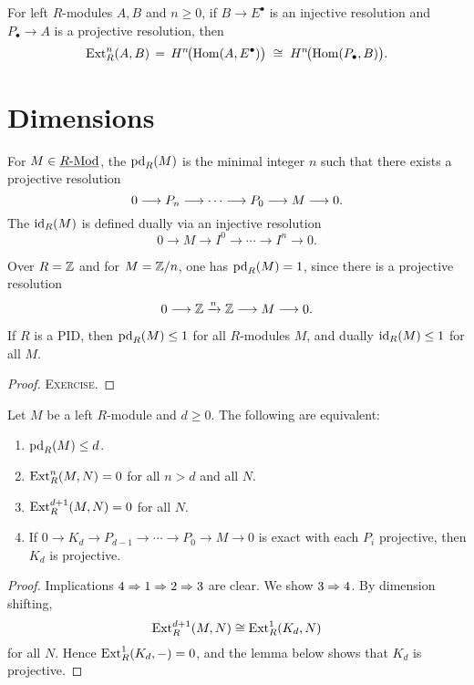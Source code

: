 \begin{theorem*}
	For left \( R \)-modules \( A,B \) and \( n\ge 0 \), if \( B\to E^\bullet \) is an injective resolution and \( P_\bullet\to A \) is a projective resolution, then
	\[
		\operatorname{Ext}_R^n(A,B) \,=\, H^n\!\bigl(\operatorname{Hom}(A,E^\bullet)\bigr) \;\cong\; H^n\!\bigl(\operatorname{Hom}(P_\bullet,B)\bigr).
	\]
\end{theorem*}

\section{Dimensions}

\begin{definition*}
	For \( M\in \underline{R\text{-}\mathrm{Mod}} \), the  \( \operatorname{pd}_R(M) \) is the minimal integer \( n \) such that there exists a projective resolution
	\[
		0 \longrightarrow P_n \longrightarrow \dotsm \longrightarrow P_0 \longrightarrow M \longrightarrow 0.
	\]
	The  \( \operatorname{id}_R(M) \) is defined dually via an injective resolution
	\[
		0 \to M \to I^0 \to \dotsm \to I^n\to 0.
	\]
\end{definition*}

\begin{example*}
	Over \( R=\mathbb{Z} \) and for \( M= \mathbb{Z}/n \), one has \( \operatorname{pd}_R(M) = 1 \), since there is a projective resolution
	\[
		0 \longrightarrow \mathbb{Z} \xrightarrow{n} \mathbb{Z} \longrightarrow M \longrightarrow 0.
	\]
\end{example*}

\begin{proposition*}
	If \( R \) is a PID, then \( \operatorname{pd}_R(M)\le 1 \) for all \( R \)-modules \( M \), and dually \( \operatorname{id}_R(M)\le 1 \) for all \( M \).
\end{proposition*}
\begin{proof}
	\textsc{Exercise.}
\end{proof}

\begin{theorem*}
	Let \( M \) be a left \( R \)-module and \( d\ge 0 \). The following are equivalent:
	\begin{enumerate}
		\item \( \operatorname{pd}_R(M)\le d \).
		\item \( \operatorname{Ext}_R^n(M,N)=0 \) for all \( n>d \) and all \( N \).
		\item \( \operatorname{Ext}_R^{d+1}(M,N)=0 \) for all \( N \).
		\item If \( 0\to K_d\to P_{d-1}\to\dotsm\to P_0\to M\to 0 \) is exact with each \( P_i \) projective, then \( K_d \) is projective.
	\end{enumerate}
\end{theorem*}
\begin{proof}
	Implications \( 4 \Rightarrow 1 \Rightarrow 2 \Rightarrow 3 \) are clear. We show \( 3 \Rightarrow 4 \). By dimension shifting,
	\[
		\operatorname{Ext}_R^{d+1}(M,N)\cong \operatorname{Ext}_R^1(K_d,N)
	\]
	for all \( N \). Hence \( \operatorname{Ext}_R^1(K_d,-)=0 \), and the lemma below shows that \( K_d \) is projective.\qedhere
\end{proof}

